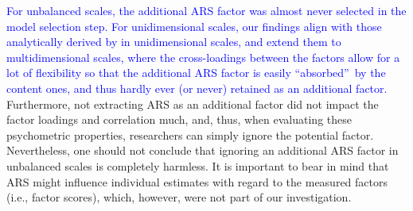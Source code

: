 \documentclass[a4paper,man,natbib]{apa6}
\begin{document}
\begin{linenumbers}
\label{refpage:R2Mj2b}\textcolor{blue}{For unbalanced scales, the additional ARS factor was almost never selected in the model selection step. For unidimensional scales, our findings align with those analytically derived by \citet{ferrando2010acquiescence} in unidimensional scales, and extend them to multidimensional scales, where the cross-loadings between the factors allow for a lot of flexibility so that the additional ARS factor is easily \textquotedblleft absorbed\textquotedblright\, by the content ones, and thus hardly ever (or never) retained as an additional factor.} Furthermore, not extracting ARS as an additional factor did not impact the factor loadings and correlation much, and, thus, when evaluating these psychometric properties, researchers can simply ignore the potential factor. Nevertheless, one should not conclude that ignoring an additional ARS factor in unbalanced scales is completely harmless. It is important to bear in mind that ARS might influence individual estimates with regard to the measured factors (i.e., factor scores), which, however, were not part of our investigation.






\end{linenumbers}
\end{document}
